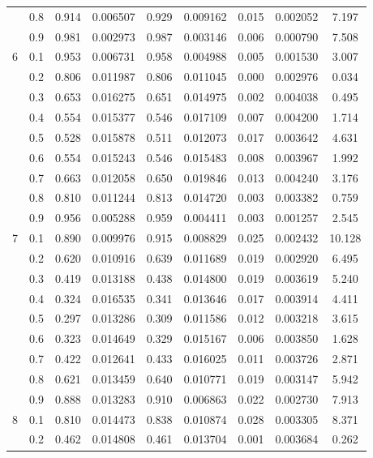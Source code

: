 \begin{longtable}{ | c | c || c | c | c | c | c | c | c | }
 & 0.8 & 0.914 & 0.006507 & 0.929 & 0.009162 & 0.015 & 0.002052 & 7.197 \\
 & 0.9 & 0.981 & 0.002973 & 0.987 & 0.003146 & 0.006 & 0.000790 & 7.508 \\
 \hline
\multirow{9}{*}{6} & 0.1 & 0.953 & 0.006731 & 0.958 & 0.004988 & 0.005 & 0.001530 & 3.007 \\
 & 0.2 & 0.806 & 0.011987 & 0.806 & 0.011045 & 0.000 & 0.002976 & 0.034 \\
 & 0.3 & 0.653 & 0.016275 & 0.651 & 0.014975 & 0.002 & 0.004038 & 0.495 \\
 & 0.4 & 0.554 & 0.015377 & 0.546 & 0.017109 & 0.007 & 0.004200 & 1.714 \\
 & 0.5 & 0.528 & 0.015878 & 0.511 & 0.012073 & 0.017 & 0.003642 & 4.631 \\
 & 0.6 & 0.554 & 0.015243 & 0.546 & 0.015483 & 0.008 & 0.003967 & 1.992 \\
 & 0.7 & 0.663 & 0.012058 & 0.650 & 0.019846 & 0.013 & 0.004240 & 3.176 \\
 & 0.8 & 0.810 & 0.011244 & 0.813 & 0.014720 & 0.003 & 0.003382 & 0.759 \\
 & 0.9 & 0.956 & 0.005288 & 0.959 & 0.004411 & 0.003 & 0.001257 & 2.545 \\
 \hline
\multirow{9}{*}{7} & 0.1 & 0.890 & 0.009976 & 0.915 & 0.008829 & 0.025 & 0.002432 & 10.128 \\
 & 0.2 & 0.620 & 0.010916 & 0.639 & 0.011689 & 0.019 & 0.002920 & 6.495 \\
 & 0.3 & 0.419 & 0.013188 & 0.438 & 0.014800 & 0.019 & 0.003619 & 5.240 \\
 & 0.4 & 0.324 & 0.016535 & 0.341 & 0.013646 & 0.017 & 0.003914 & 4.411 \\
 & 0.5 & 0.297 & 0.013286 & 0.309 & 0.011586 & 0.012 & 0.003218 & 3.615 \\
 & 0.6 & 0.323 & 0.014649 & 0.329 & 0.015167 & 0.006 & 0.003850 & 1.628 \\
 & 0.7 & 0.422 & 0.012641 & 0.433 & 0.016025 & 0.011 & 0.003726 & 2.871 \\
 & 0.8 & 0.621 & 0.013459 & 0.640 & 0.010771 & 0.019 & 0.003147 & 5.942 \\
 & 0.9 & 0.888 & 0.013283 & 0.910 & 0.006863 & 0.022 & 0.002730 & 7.913 \\
 \hline
\multirow{9}{*}{8} & 0.1 & 0.810 & 0.014473 & 0.838 & 0.010874 & 0.028 & 0.003305 & 8.371 \\
 & 0.2 & 0.462 & 0.014808 & 0.461 & 0.013704 & 0.001 & 0.003684 & 0.262 \\

\end{longtable}
